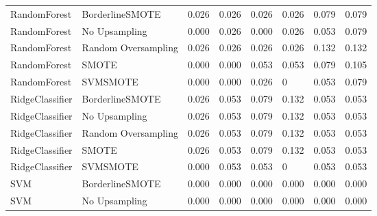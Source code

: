 \begin{tabular}{llllllll}
                RandomForest &     BorderlineSMOTE & 0.026 &                     0.026 &                 0.026 &                  0.026 &                                   0.079 &    0.079 \\
                RandomForest &       No Upsampling & 0.000 &                     0.026 &                 0.000 &                  0.026 &                                   0.053 &    0.079 \\
                RandomForest & Random Oversampling & 0.026 &                     0.026 &                 0.026 &                  0.026 &                                   0.132 &    0.132 \\
                RandomForest &               SMOTE & 0.000 &                     0.000 &                 0.053 &                  0.053 &                                   0.079 &    0.105 \\
                RandomForest &            SVMSMOTE & 0.000 &                     0.000 &                 0.026 &                      0 &                                   0.053 &    0.079 \\
             RidgeClassifier &     BorderlineSMOTE & 0.026 &                     0.053 &                 0.079 &                  0.132 &                                   0.053 &    0.053 \\
             RidgeClassifier &       No Upsampling & 0.026 &                     0.053 &                 0.079 &                  0.132 &                                   0.053 &    0.053 \\
             RidgeClassifier & Random Oversampling & 0.026 &                     0.053 &                 0.079 &                  0.132 &                                   0.053 &    0.053 \\
             RidgeClassifier &               SMOTE & 0.026 &                     0.053 &                 0.079 &                  0.132 &                                   0.053 &    0.053 \\
             RidgeClassifier &            SVMSMOTE & 0.000 &                     0.053 &                 0.053 &                      0 &                                   0.053 &    0.053 \\
                         SVM &     BorderlineSMOTE & 0.000 &                     0.000 &                 0.000 &                  0.000 &                                   0.000 &    0.000 \\
                         SVM &       No Upsampling & 0.000 &                     0.000 &                 0.000 &                  0.000 &                                   0.000 &    0.000 \\

\end{tabular}
